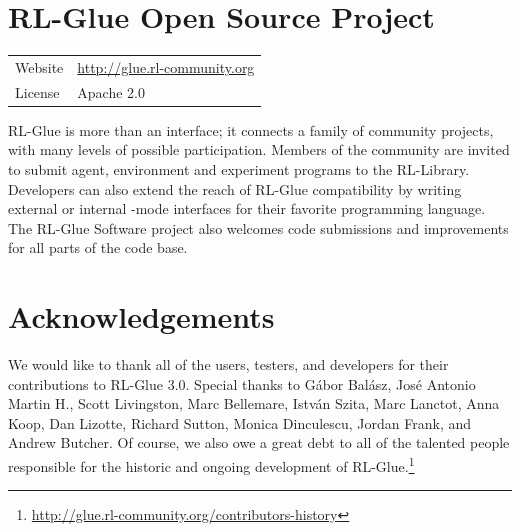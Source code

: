 \documentclass[twoside,11pt]{article}
\begin{document}
 
\section{RL-Glue Open Source Project}
\begin{tabular}{ l l }
  Website &  \url{http://glue.rl-community.org} \\
  License & Apache 2.0  \\
\end{tabular}
\newline
\newline
RL-Glue is more than an interface; it connects a family of community projects, with many levels of possible participation. Members of the community are invited to submit agent, environment and experiment programs to the RL-Library. Developers can also extend the reach of RL-Glue compatibility by writing external or internal -mode interfaces for their favorite programming language.  The RL-Glue Software project also welcomes code submissions and improvements for all parts of the code base.  





\section{Acknowledgements}
We would like to thank all of the users, testers, and developers for their contributions to RL-Glue 3.0. Special thanks to 
G\'{a}bor Bal\'{a}sz,  %
Jos\'{e} Antonio Martin H.,  %
Scott Livingston, %
Marc Bellemare, 
Istv\'{a}n Szita,  %
Marc Lanctot, 
Anna Koop, 
Dan Lizotte,
Richard Sutton,
Monica Dinculescu,
Jordan Frank, and
Andrew Butcher.  Of course, we also owe a great debt to all of the talented people responsible for the historic and ongoing development of RL-Glue.\footnote{\url{http://glue.rl-community.org/contributors-history}}

%
%




\end{document}
